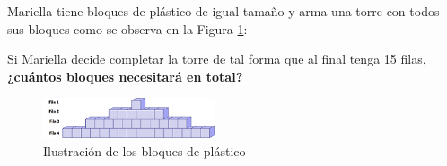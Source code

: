 \question[10] Mariella tiene bloques de plástico de igual tamaño y arma una torre con todos sus bloques como se observa en la Figura \ref{fig:bloques_plastico}:

Si Mariella decide completar la torre de tal forma que al final tenga 15 filas,
\textbf{¿cuántos bloques necesitará en total?}

\begin{figure}[H]
    \centering
    \includegraphics[width=0.45\textwidth]{../images/57c79607ac0a75446759bf7de89522cf0cbcea57}
    \caption{Ilustración de los bloques de plástico}
    \label{fig:bloques_plastico}
\end{figure}
